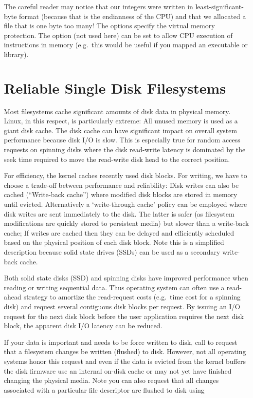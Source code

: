 The careful reader may notice that our integers were written in least-significant-byte format (because that is the endianness of the CPU) and that we allocated a file that is one byte too many! The  options specify the virtual memory protection. The option  (not used here) can be set to allow CPU execution of instructions in memory (e.g.~this would be useful if you mapped an executable or library).

\section{Reliable Single Disk Filesystems}

Most filesystems cache significant amounts of disk data in physical memory. Linux, in this respect, is particularly extreme: All unused memory is used as a giant disk cache. The disk cache can have significant impact on overall system performance because disk I/O is slow. This is especially true for random access requests on spinning disks where the disk read-write latency is dominated by the seek time required to move the read-write disk head to the correct position.

For efficiency, the kernel caches recently used disk blocks. For writing, we have to choose a trade-off between performance and reliability: Disk writes can also be cached (``Write-back cache'') where modified disk blocks are stored in memory until evicted. Alternatively a `write-through cache' policy can be employed where disk writes are sent immediately to the disk. The latter is safer (as filesystem modifications are quickly stored to persistent media) but slower than a write-back cache; If writes are cached then they can be delayed and efficiently scheduled based on the physical position of each disk block. Note this is a simplified description because solid state drives (SSDs) can be used as a secondary write-back cache.

Both solid state disks (SSD) and spinning disks have improved performance when reading or writing sequential data. Thus operating system can often use a read-ahead strategy to amortize the read-request costs (e.g.~time cost for a spinning disk) and request several contiguous disk blocks per request. By issuing an I/O request for the next disk block before the user application requires the next disk block, the apparent disk I/O latency can be reduced.

If your data is important and needs to be force written to disk, call  to request that a filesystem changes be written (flushed) to disk. However, not all operating systems honor this request and even if the data is evicted from the kernel buffers the disk firmware use an internal on-disk cache or may not yet have finished changing the physical media. Note you can also request that all changes associated with a particular file descriptor are flushed to disk using 

